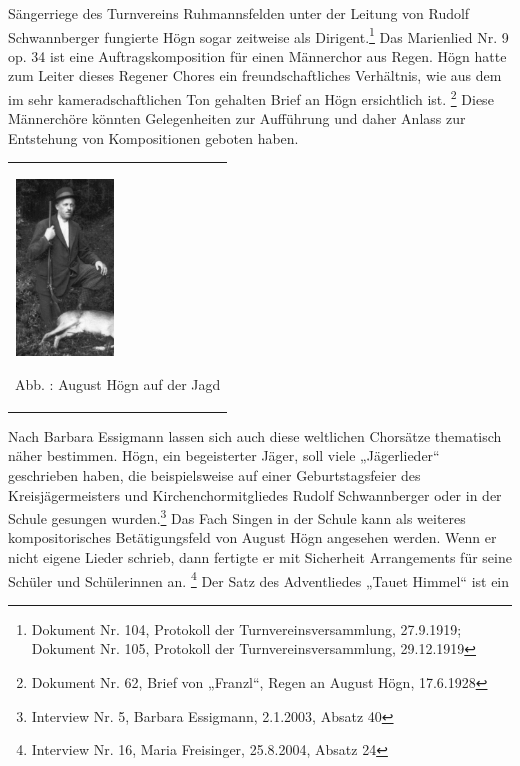 \documentclass[a4paper]{article}
\newcounter{Abb}
\renewcommand\theAbb{\arabic{Abb}}
\begin{document}
Sängerriege des Turnvereins Ruhmannsfelden unter der Leitung von Rudolf
Schwannberger fungierte Högn sogar zeitweise als Dirigent.\footnote{
Dokument Nr. 104, Protokoll der Turnvereinsversammlung, 27.9.1919;
Dokument Nr. 105, Protokoll der Turnvereinsversammlung, 29.12.1919} Das
Marienlied Nr. 9 op. 34 ist eine Auftragskomposition für einen
Männerchor aus Regen. Högn hatte zum Leiter dieses Regener Chores ein
freundschaftliches Verhältnis, wie aus dem im sehr kameradschaftlichen
Ton gehalten Brief an Högn ersichtlich ist. \footnote{Dokument Nr. 62,
Brief von „Franzl“, Regen an August Högn, 17.6.1928} Diese Männerchöre
könnten Gelegenheiten zur Aufführung und daher Anlass zur Entstehung
von Kompositionen geboten haben.

\begin{flushleft}
\tablefirsthead{}
\tablehead{}
\tabletail{}
\tablelasttail{}
\begin{supertabular}{m{2.809cm}}

\begin{center}

\includegraphics[width=2.626cm,height=4.68cm]{pictures/zulassungsarbeit-img068.jpg}

\end{center}
Abb. \stepcounter{Abb}{\theAbb}: August Högn auf der Jagd\\
\end{supertabular}
\end{flushleft}
Nach Barbara Essigmann lassen sich auch diese weltlichen Chorsätze
thematisch näher bestimmen. Högn, ein begeisterter Jäger, soll viele
„Jägerlieder“ geschrieben haben, die beispielsweise auf einer
Geburtstagsfeier des Kreisjägermeisters und Kirchenchormitgliedes
Rudolf Schwannberger oder in der Schule gesungen wurden.\footnote{
Interview Nr. 5, Barbara Essigmann, 2.1.2003, Absatz 40} Das Fach
Singen in der Schule kann als weiteres kompositorisches Betätigungsfeld
von August Högn angesehen werden. Wenn er nicht eigene Lieder schrieb,
dann fertigte er mit Sicherheit Arrangements für seine Schüler und
Schülerinnen an. \footnote{Interview Nr. 16, Maria Freisinger,
25.8.2004, Absatz 24} Der Satz des Adventliedes „Tauet Himmel“ ist ein
\end{document}
